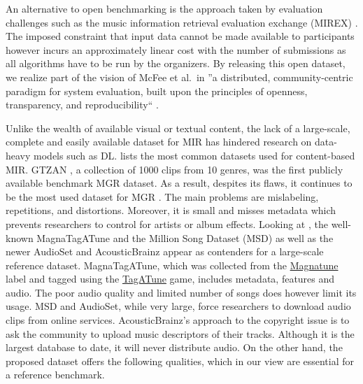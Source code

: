 \documentclass{article}
\begin{document}
An alternative to open benchmarking is the approach taken by evaluation challenges such as the music information retrieval evaluation exchange (MIREX) \cite{mirex}. The imposed constraint that input data cannot be made available to participants however incurs an approximately linear cost with the number of submissions as all algorithms have to be run by the organizers. By releasing this open dataset, we realize part of the vision of McFee et al.\ in ''a distributed, community-centric paradigm for system evaluation, built upon the principles of openness, transparency, and reproducibility`` \cite{mirex_critic}.

Unlike the wealth of available visual or textual content, the lack of a large-scale, complete and easily available dataset for MIR has hindered research on data-heavy models such as DL.
 lists the most common datasets used for content-based MIR.
GTZAN \cite{gtzan}, a collection of 1000 clips from 10 genres, was the first publicly available benchmark MGR dataset. As a result, despites its flaws, it continues to be the most used dataset for MGR \cite{mgr_eval_2}. The main problems are mislabeling, repetitions, and distortions. Moreover, it is small and misses metadata which prevents researchers to control for artists or album effects. %
Looking at , the well-known MagnaTagATune \cite{magnatagatune} and the Million Song Dataset (MSD) \cite{msd} as well as the newer AudioSet \cite{audioset} and AcousticBrainz \cite{acousticbrainz} appear as contenders for a large-scale reference dataset. %
MagnaTagATune, which was collected from the \href{https://magnatune.com/}{Magnatune} label and tagged using the \href{http://tagatune.org/}{TagATune} game, includes metadata, features and audio. The poor audio quality and limited number of songs does however limit its usage.
MSD and AudioSet, while very large, force researchers to download audio clips from online services. AcousticBrainz's approach to the copyright issue is to ask the community to upload music descriptors of their tracks. Although it is the largest database to date, it will never distribute audio.
On the other hand, the proposed dataset offers the following qualities, which in our view are essential for a reference benchmark.
\end{document}

